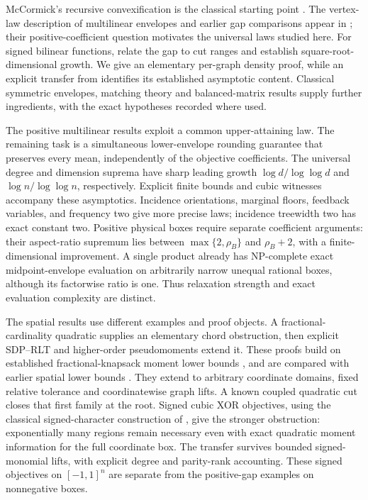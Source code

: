 \documentclass[11pt]{article}
\begin{document}
McCormick's recursive convexification is the classical starting point
\citep{McCormick1976}. The vertex-law description of multilinear envelopes
and earlier gap comparisons appear in \citet{Luedtke2012}; their
positive-coefficient question motivates the universal laws studied here.
For signed bilinear functions, \citet{Boland2017} relate the gap to cut
ranges and establish square-root-dimensional growth. We give an elementary
per-graph density proof, while an explicit transfer from
\citet{DavidsonDonsig2007} identifies its established asymptotic content.
Classical symmetric envelopes, matching theory and balanced-matrix results
supply further ingredients, with the exact hypotheses recorded where used.

The positive multilinear results exploit a common upper-attaining law.
The remaining task is a simultaneous lower-envelope rounding guarantee
that preserves every mean, independently of the objective coefficients.
The universal degree and dimension suprema have sharp leading growth
$\log d/\log\log d$ and $\log n/\log\log n$, respectively. Explicit finite
bounds and cubic witnesses accompany these asymptotics. Incidence
orientations, marginal floors, feedback variables, and frequency two give
more precise laws; incidence treewidth two has exact constant two.
Positive physical boxes require separate coefficient arguments: their
aspect-ratio supremum lies between $\max\{2,\rho_B\}$ and $\rho_B+2$,
with a finite-dimensional improvement. A single product already has
NP-complete exact midpoint-envelope evaluation on arbitrarily narrow
unequal rational boxes, although its factorwise ratio is one. Thus
relaxation strength and exact evaluation complexity are distinct.

The spatial results use different examples and proof objects. A
fractional-cardinality quadratic supplies an elementary chord obstruction,
then explicit SDP--RLT and higher-order pseudomoments extend it. These
proofs build on established fractional-knapsack moment lower bounds
\citep{Grigoriev2001,Potechin2019}, and are compared with earlier spatial
lower bounds \citep{Jarre2018}. They extend to arbitrary coordinate domains,
fixed relative tolerance and coordinatewise graph lifts. A known coupled
quadratic cut closes that first family at the root. Signed cubic XOR
objectives, using the classical signed-character construction of
\citet{Schoenebeck2008}, give the stronger obstruction: exponentially many
regions remain necessary even with exact quadratic moment information for
the full coordinate box. The transfer survives bounded signed-monomial
lifts, with explicit degree and parity-rank accounting. These signed
objectives on $[-1,1]^n$ are separate from the positive-gap examples on
nonnegative boxes.
\end{document}
